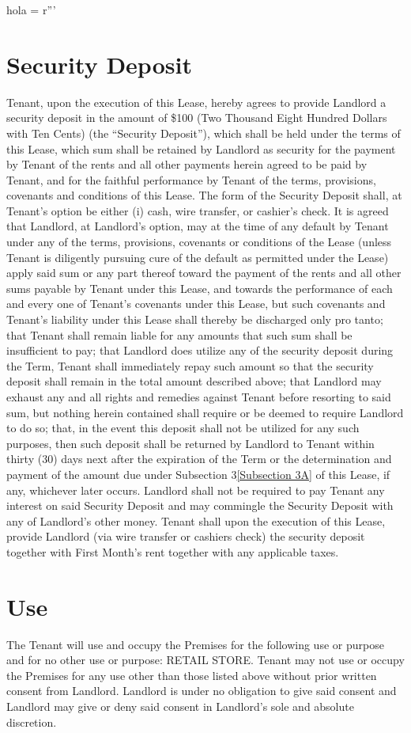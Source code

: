 hola = r'''\documentclass{article}
\newcommand{\securitydepositnumbers}{\$100}
\newcommand{\securitydepositwords}{Two Thousand Eight Hundred Dollars with Ten Cents}
\newcommand{\use}{RETAIL STORE}
\begin{document}
\section{Security Deposit}\label{Security Deposit}
    Tenant, upon the execution of this Lease, hereby agrees to provide Landlord a security deposit in the amount of \securitydepositnumbers {} (\securitydepositwords) (the ``Security Deposit''), which shall be held under the terms of this Lease, which sum shall be retained by Landlord as security for the payment by Tenant of the rents and all other payments herein agreed to be paid by Tenant, and for the faithful performance by Tenant of the terms, provisions, covenants and conditions of this Lease. The form of the Security Deposit shall, at Tenant's option be either (i) cash, wire transfer, or cashier's check. It is agreed that Landlord, at Landlord's option, may at the time of any default by Tenant under any of the terms, provisions, covenants or conditions of the Lease (unless Tenant is diligently pursuing cure of the default as permitted under the Lease) apply said sum or any part thereof toward the payment of the rents and all other sums payable by Tenant under this Lease, and towards the performance of each and every one of Tenant's covenants under this Lease, but such covenants and Tenant's liability under this Lease shall thereby be discharged only pro tanto; that Tenant shall remain liable for any amounts that such sum shall be insufficient to pay; that Landlord does utilize any of the security deposit during the Term, Tenant shall immediately repay such amount so that the security deposit shall remain in the total amount described above; that Landlord may exhaust any and all rights and remedies against Tenant before resorting to said sum, but nothing herein contained shall require or be deemed to require Landlord to do so; that, in the event this deposit shall not be utilized for any such purposes, then such deposit shall be returned by Landlord to Tenant within thirty (30) days next after the expiration of the Term or the determination and payment of the amount due under Subsection 3\ref{Subsection 3A} of this Lease, if any, whichever later occurs. Landlord shall not be required to pay Tenant any interest on said Security Deposit and may commingle the Security Deposit with any of Landlord’s other money.
    Tenant shall upon the execution of this Lease, provide Landlord (via wire transfer or cashiers check) the security deposit together with First Month's rent together with any applicable taxes.
\section{Use}
    The Tenant will use and occupy the Premises for the following use or purpose and for no other use or purpose: \use.
    Tenant may not use or occupy the Premises for any use other than those listed above without prior written consent from Landlord.  Landlord is under no obligation to give said consent and Landlord may give or deny said consent in Landlord's sole and absolute discretion.  
\end{document}
